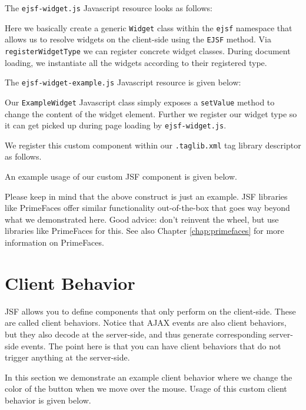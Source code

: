 The \texttt{ejsf-widget.js} Javascript resource looks as follows:

Here we basically create a generic \texttt{Widget} class within the \texttt{ejsf} namespace that allows us to resolve widgets on the client-side using the \texttt{EJSF} method.
Via \texttt{registerWidgetType} we can register concrete widget classes.
During document loading, we instantiate all the widgets according to their registered type.

The \texttt{ejsf-widget-example.js} Javascript resource is given below:

Our \texttt{ExampleWidget} Javascript class simply exposes a \texttt{setValue} method to change the content of the widget element.
Further we register our widget type so it can get picked up during page loading by \texttt{ejsf-widget.js}.

We register this custom component within our \texttt{.taglib.xml} tag library descriptor as follows.


An example usage of our custom JSF component is given below.

Please keep in mind that the above construct is just an example.
JSF libraries like PrimeFaces offer similar functionality out-of-the-box that goes way beyond what we demonstrated here.
Good advice: don't reinvent the wheel, but use libraries like PrimeFaces for this.
See also Chapter \ref{chap:primefaces} for more information on PrimeFaces.

\section{Client Behavior}
JSF allows you to define components that only perform on the client-side.
These are called client behaviors.
Notice that AJAX events are also client behaviors, but they also decode at the server-side, and thus generate corresponding server-side events.
The point here is that you can have client behaviors that do not trigger anything at the server-side.

In this section we demonstrate an example client behavior where we change the color of the button when we move over the mouse.
Usage of this custom client behavior is given below.


